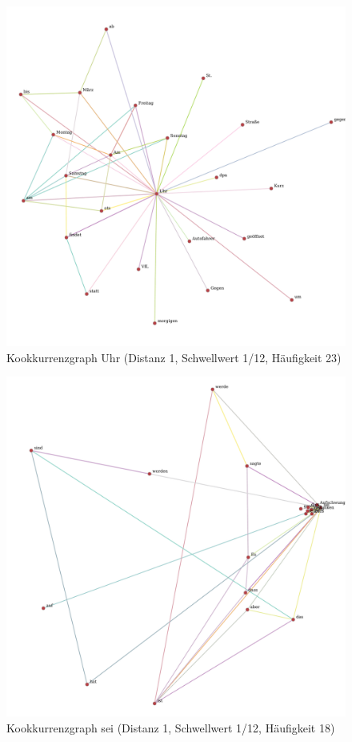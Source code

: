 \documentclass[11pt, a4paper]{article}
\begin{document}
\begin{figure}[hp!]
    \centering
        \includegraphics[scale=.4]{../../data/results/cooc_denews10k/topwords/graph_Uhr.pdf}
    \caption{Kookkurrenzgraph Uhr (Distanz 1, Schwellwert 1/12, Häufigkeit 23)}
    \label{fig:hw-uhr}
\end{figure}

\begin{figure}[hp!]
    \centering
        \includegraphics[scale=.4]{../../data/results/cooc_denews10k/topwords/graph_sei.pdf}
    \caption{Kookkurrenzgraph sei (Distanz 1, Schwellwert 1/12, Häufigkeit 18)}
    \label{fig:hw-sei}
\end{figure}
\end{document}
